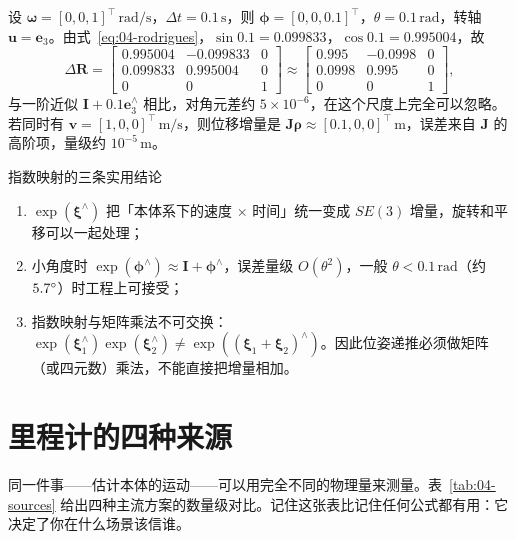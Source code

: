 \begin{example}[一次增量到底转了多少]
设 $\bm{\omega}=[0,0,1]^{\top}\,\mathrm{rad/s}$，$\Delta t=0.1\,\mathrm{s}$，则 $\bm{\phi}=[0,0,0.1]^{\top}$，$\theta=0.1\,\mathrm{rad}$，转轴 $\bm{u}=\bm{e}_3$。由式~\eqref{eq:04-rodrigues}，$\sin0.1=0.099833$，$\cos0.1=0.995004$，故
\begin{equation}
  \Delta\bm{R} = \begin{bmatrix}0.995004 & -0.099833 & 0\\ 0.099833 & 0.995004 & 0\\ 0&0&1\end{bmatrix}
  \approx \begin{bmatrix}0.995 & -0.0998 & 0\\ 0.0998 & 0.995 & 0\\ 0&0&1\end{bmatrix},
\end{equation}
与一阶近似 $\bm{I}+0.1\bm{e}_3^{\wedge}$ 相比，对角元差约 $5\times10^{-6}$，在这个尺度上完全可以忽略。若同时有 $\bm{v}=[1,0,0]^{\top}\,\mathrm{m/s}$，则位移增量是 $\bm{J}\bm{\rho}\approx[0.1,0,0]^{\top}\,\mathrm{m}$，误差来自 $\bm{J}$ 的高阶项，量级约 $10^{-5}\,\mathrm{m}$。
\end{example}

\begin{keybox}{指数映射的三条实用结论}
\begin{enumerate}
  \item $\exp(\bm{\xi}^{\wedge})$ 把「本体系下的速度 $\times$ 时间」统一变成 $SE(3)$ 增量，旋转和平移可以一起处理；
  \item 小角度时 $\exp(\bm{\phi}^{\wedge})\approx\bm{I}+\bm{\phi}^{\wedge}$，误差量级 $O(\theta^{2})$，一般 $\theta<0.1\,\mathrm{rad}$（约 $5.7^\circ$）时工程上可接受；
  \item 指数映射与矩阵乘法不可交换：$\exp(\bm{\xi}_1^{\wedge})\exp(\bm{\xi}_2^{\wedge})\ne\exp((\bm{\xi}_1+\bm{\xi}_2)^{\wedge})$。因此位姿递推必须做矩阵（或四元数）乘法，不能直接把增量相加。
\end{enumerate}
\end{keybox}

\section{里程计的四种来源}\label{sec:04-sources}

同一件事——估计本体的运动——可以用完全不同的物理量来测量。表~\ref{tab:04-sources} 给出四种主流方案的数量级对比。记住这张表比记住任何公式都有用：它决定了你在什么场景该信谁。

